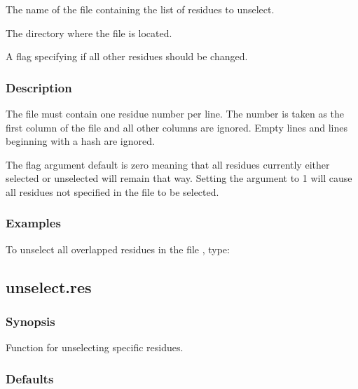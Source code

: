   The name of the file containing the list of residues to unselect. 

  The directory where the file is located. 

  A flag specifying if all other residues should be changed. 




\subsubsection{Description}

The file must contain one residue number per line.  The number is taken as the first column of the file and all other columns are ignored.  Empty lines and lines beginning with a hash are ignored.


The  flag argument default is zero meaning that all residues currently either selected or unselected will remain that way.  Setting the argument to 1 will cause all residues not specified in the file to be selected.



\subsubsection{Examples}

To unselect all overlapped residues in the file , type:






\newpage

\subsection{unselect.res}


\subsubsection{Synopsis}

Function for unselecting specific residues.



\subsubsection{Defaults}

